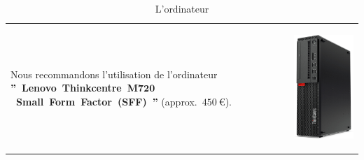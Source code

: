 \documentclass[12pt, a4paper]{article}
\newcommand{\money}[1]{$#1\ \euro{}$\xspace}
\begin{document}
\begin{table}[!htbp]
\begin{tabular}{lr}
\parbox{25em}{
Nous recommandons l'utilisation de
l'ordinateur
\textbf{''~Lenovo~Thinkcentre~M$\mathbf{720}$~Small~Form~Factor~(SFF)~''}
(approx.~\money{450}).
\vspace{-3em}
}

&

\parbox{17em}{
\begin{center}
\includegraphics[scale=0.14]{images/lenovo-thinkcentre-m710sff-hardware.png}
\caption*{L'ordinateur}
\end{center}
}
\end{tabular}
\end{table}
	
\end{document}
